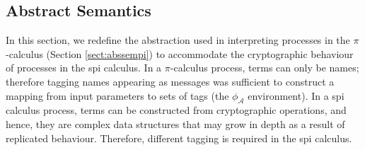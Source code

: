 \documentclass[10pt,a4paper,final,oneside,fleqn]{book}
\begin{document}
\subsection{Abstract Semantics\label{sect:abssemspi}}
In this section, we redefine the abstraction used in interpreting processes in the $\pi$-calculus (Section \ref{sect:abssempi}) to accommodate the cryptographic behaviour of processes in the spi calculus.  In a $\pi$-calculus process, terms can only be names; therefore tagging names appearing as messages was sufficient to construct a mapping from input parameters to sets of tags (the $\phi_\mathcal{A}$ environment).  In a spi calculus process, terms can be constructed from cryptographic operations, and hence, they are complex data structures that may grow in depth as a result of replicated behaviour.  Therefore, different tagging is required in the spi calculus.
\end{document}

